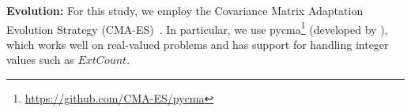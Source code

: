 \noindent
\textbf{Evolution:}
%
For this study, we employ the Covariance Matrix Adaptation Evolution Strategy (CMA-ES)~\citep{Hansen.2003.EC.CMAES}.
%
In particular, we use pycma\footnote{\url{https://github.com/CMA-ES/pycma}} (developed by \citeauthor{Hansen.2003.EC.CMAES}), which
%
works well on real-valued problems and has support for handling integer values such as $\mathit{ExtCount}$.
%
